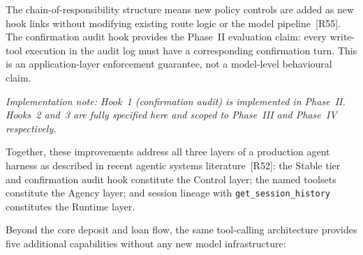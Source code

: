 \documentclass[12pt,a4paper]{report}
\begin{document}
\noindent The chain-of-responsibility structure means new policy controls are added
as new hook links without modifying existing route logic or the model
pipeline~[R55]. The confirmation audit hook provides the Phase~II
evaluation claim: every write-tool execution in the audit log must have a
corresponding confirmation turn. This is an application-layer enforcement
guarantee, not a model-level behavioural claim.

\textit{Implementation note: Hook~1 (confirmation audit) is implemented in
Phase~II. Hooks~2 and~3 are fully specified here and scoped to Phase~III
and Phase~IV respectively.}

\noindent Together, these improvements address all three layers of a
production agent harness as described in recent agentic systems
literature~[R52]: the Stable tier and confirmation audit
hook constitute the Control layer; the named toolsets constitute the
Agency layer; and session lineage with \texttt{get\_session\_history}
constitutes the Runtime layer.


Beyond the core deposit and loan flow, the same tool-calling architecture provides five additional capabilities without any new model infrastructure:
\end{document}
